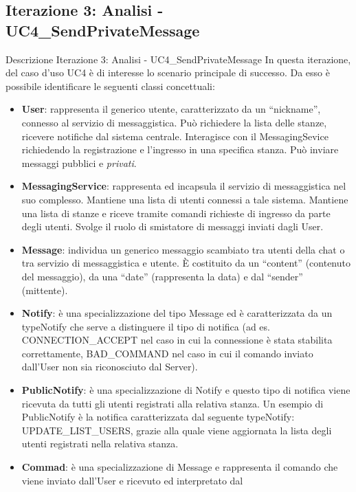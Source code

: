 \subsection {Iterazione 3: Analisi - UC4\_SendPrivateMessage}
\begin{frame} [allowframebreaks] {Descrizione Iterazione 3: Analisi - UC4\_SendPrivateMessage}
  In questa iterazione, del caso d’uso UC4 è di interesse lo scenario principale di successo.  Da esso è possibile identificare le seguenti classi concettuali: 
  \begin{itemize}
   \item \textbf{User}: rappresenta il generico utente, caratterizzato da un ``nickname'', connesso al servizio di messaggistica. Può richiedere la lista delle 
         stanze, ricevere notifiche dal sistema centrale. Interagisce con il MessagingSevice richiedendo la registrazione e l’ingresso in una specifica stanza. 
         Può inviare messaggi pubblici e \textit{privati}.
   \item \textbf{MessagingService}: rappresenta ed incapsula il servizio di messaggistica nel suo complesso. Mantiene una lista di utenti connessi a tale sistema. 
          Mantiene una lista di stanze e riceve tramite comandi richieste di ingresso da parte degli utenti. Svolge il ruolo di smistatore di messaggi inviati dagli 
          User.
   \item \textbf{Message}: individua un generico messaggio scambiato tra utenti della chat o tra servizio di messaggistica e utente. È costituito da un 
         ``content'' (contenuto del messaggio), da una ``date'' (rappresenta la data) e dal ``sender'' (mittente).
   \item \textbf{Notify}: è una specializzazione del tipo Message ed è caratterizzata da un typeNotify che serve a distinguere il tipo di notifica (ad es. 
          CONNECTION\_ACCEPT nel caso in cui la connessione è stata stabilita correttamente, BAD\_COMMAND nel caso in cui il comando inviato dall'User non 
          sia riconosciuto dal Server).
   \item \textbf{PublicNotify}: è una specializzazione di Notify e questo tipo di notifica viene ricevuta da tutti gli utenti registrati alla relativa 
          stanza. Un esempio di PublicNotify è la notifica caratterizzata dal seguente typeNotify: UPDATE\_LIST\_USERS, grazie alla quale viene 
          aggiornata la lista degli utenti registrati nella relativa stanza.
   \item  \textbf{Commad}: è una specializzazione di Message e rappresenta il comando che viene inviato dall'User e ricevuto ed interpretato dal            

\end{itemize}
\end{frame}
